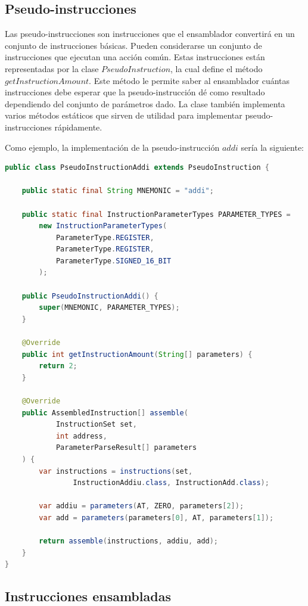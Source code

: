 \subsection{Pseudo-instrucciones}\label{subsec:pseudo-instrucciones}

Las pseudo-instrucciones son instrucciones que el ensamblador
convertirá en un conjunto de instrucciones básicas.
Pueden considerarse un conjunto de instrucciones que ejecutan una acción común.
Estas instrucciones están representadas por la clase $PseudoInstruction$,
la cual define el método $getInstructionAmount$.
Este método le permite saber al ensamblador cuántas instrucciones
debe esperar que la pseudo-instrucción dé como resultado dependiendo
del conjunto de parámetros dado.
La clase también implementa varios métodos estáticos que sirven
de utilidad para implementar pseudo-instrucciones rápidamente.

\noindent Como ejemplo, la implementación de la pseudo-instrucción
$addi$ sería la siguiente:

\begin{lstlisting}[language=Java,style=java,frame=single,label={lst:pseudo-instruction}]
public class PseudoInstructionAddi extends PseudoInstruction {

    public static final String MNEMONIC = "addi";

    public static final InstructionParameterTypes PARAMETER_TYPES =
        new InstructionParameterTypes(
            ParameterType.REGISTER,
            ParameterType.REGISTER,
            ParameterType.SIGNED_16_BIT
        );

    public PseudoInstructionAddi() {
        super(MNEMONIC, PARAMETER_TYPES);
    }

    @Override
    public int getInstructionAmount(String[] parameters) {
        return 2;
    }

    @Override
    public AssembledInstruction[] assemble(
            InstructionSet set,
            int address,
            ParameterParseResult[] parameters
    ) {
        var instructions = instructions(set,
                InstructionAddiu.class, InstructionAdd.class);

        var addiu = parameters(AT, ZERO, parameters[2]);
        var add = parameters(parameters[0], AT, parameters[1]);

        return assemble(instructions, addiu, add);
    }
}
\end{lstlisting}

\subsection{Instrucciones ensambladas}\label{subsec:instrucciones-ensambladas}

